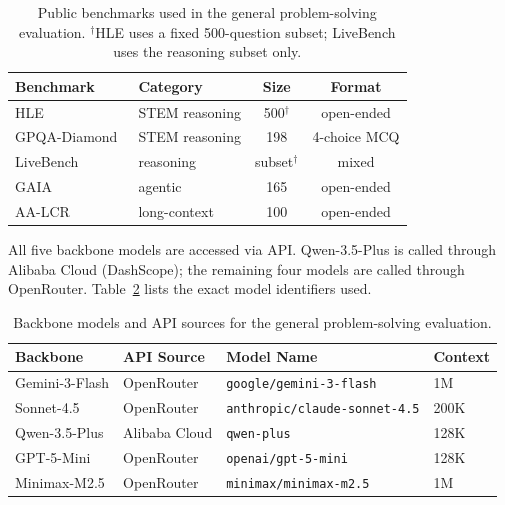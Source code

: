 \begin{table}[ht!]
\centering
\small
\begin{tabular}{@{}llcc@{}}
\toprule
\textbf{Benchmark} & \textbf{Category} & \textbf{Size} & \textbf{Format} \\
\midrule
HLE~\citep{phan2025hle} & STEM reasoning & 500$^\dagger$ & open-ended \\
GPQA-Diamond~\citep{rein2024gpqa} & STEM reasoning & 198 & 4-choice MCQ \\
LiveBench~\citep{white2025livebench} & reasoning & subset$^\dagger$ & mixed \\
GAIA~\citep{mialon2024gaia} & agentic & 165 & open-ended \\
AA-LCR~\citep{artificialanalysis2025lcr} & long-context & 100 & open-ended \\
\bottomrule
\end{tabular}
\caption{Public benchmarks used in the general problem-solving evaluation.
$^\dagger$HLE uses a fixed 500-question subset; LiveBench uses the reasoning subset only.}
\label{tab:benchmarks}
\end{table}

All five backbone models are accessed via API.
Qwen-3.5-Plus is called through Alibaba Cloud (DashScope); the remaining four models are called through OpenRouter.
Table~\ref{tab:backbones} lists the exact model identifiers used.

\begin{table}[ht!]
\centering
\small
\begin{tabular}{@{}llll@{}}
\toprule
\textbf{Backbone} & \textbf{API Source} & \textbf{Model Name} & \textbf{Context} \\
\midrule
Gemini-3-Flash  & OpenRouter    & \texttt{google/gemini-3-flash}       & 1M \\
Sonnet-4.5      & OpenRouter    & \texttt{anthropic/claude-sonnet-4.5} & 200K \\
Qwen-3.5-Plus   & Alibaba Cloud & \texttt{qwen-plus}                  & 128K \\
GPT-5-Mini      & OpenRouter    & \texttt{openai/gpt-5-mini}           & 128K \\
Minimax-M2.5    & OpenRouter    & \texttt{minimax/minimax-m2.5}        & 1M \\
\bottomrule
\end{tabular}
\caption{Backbone models and API sources for the general problem-solving evaluation.}
\label{tab:backbones}
\end{table}

